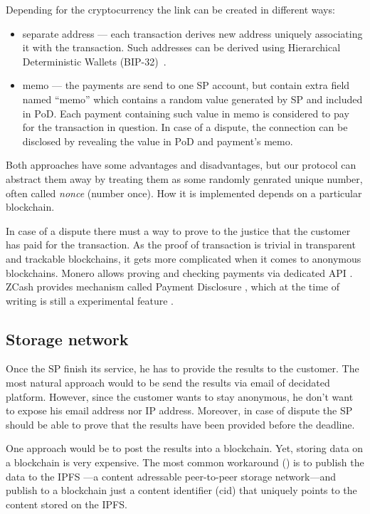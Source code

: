 \documentclass{ieeeaccess}
\begin{document}
Depending for the cryptocurrency the link can be created in different
ways:

\begin{itemize}

\item
  separate address — each transaction derives new address uniquely
  associating it with the transaction. Such addresses can be derived
  using Hierarchical Deterministic Wallets (BIP-32)~\cite{bipsbip089}.
\item
  memo — the payments are send to one SP account, but contain extra
  field named ``memo'' which contains a random value generated by SP and
  included in $\mathrm{PoD}$. Each payment containing such value in memo is
  considered to pay for the transaction in question. In case of a dispute,
  the connection can be disclosed by revealing the value in $\mathrm{PoD}$ and payment's memo.
\end{itemize}

Both approaches have some advantages and disadvantages, but our protocol
can abstract them away by treating them as some randomly genrated unique
number, often called \textit{nonce} (number once). How it is implemented
depends on a particular blockchain.

In case of a dispute there must a way to prove to the justice that the
customer has paid for the transaction. As the proof of transaction is
trivial in transparent and trackable blockchains, it gets more
complicated when it comes to anonymous blockchains. Monero allows
proving and checking payments via dedicated API \cite{Howtopro46}.
ZCash provides mechanism called Payment Disclosure \cite{AnIntrod25},
which at the time of writing is still a experimental feature
\cite{paymentd11}.

\subsection{Storage network}\label{storage-network}
Once the SP finish its service, he has to provide the results to the
customer. The most natural approach would to be send the results via
email of decidated platform. However, since the customer wants to stay
anonymous, he don't want to expose his email address nor IP address.
Moreover, in case of dispute the SP should be able to prove that the
results have been provided before the deadline.

One approach would be to post the results into a blockchain. Yet,
storing data on a blockchain is very expensive. The most common
workaround
(\cite{shahid2020blockchain, wang2019auditable, chen2017improved, Usageide95})
is to publish the data to the IPFS \cite{benet2014ipfs}—a content
adressable peer-to-peer storage network—and publish to a blockchain
just a content identifier (cid) that uniquely points to the content
stored on the IPFS.
\end{document}
